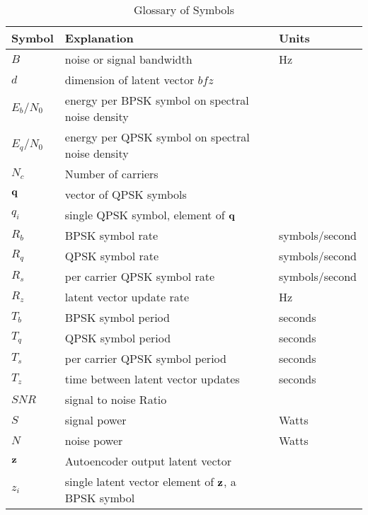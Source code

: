 \documentclass{article}
\begin{document}
\begin{table} [H]
\centering
\begin{tabular}{l l l}
 \hline
 Symbol & Explanation & Units \\
 \hline
 $B$ & noise or signal bandwidth & Hz \\
 $d$ & dimension of latent vector $bf{z}$ \\
 $E_b/N_0$ & energy per BPSK symbol on spectral noise density \\
 $E_q/N_0$ & energy per QPSK symbol on spectral noise density \\
 $N_c$ & Number of carriers  \\
 $\bf{q}$ & vector of QPSK symbols \\ 
 $q_i$ & single QPSK symbol, element of $\bf{q}$ \\ 
 $R_b$ & BPSK symbol rate & symbols/second \\
 $R_q$ & QPSK symbol rate & symbols/second \\
 $R_s$ & per carrier QPSK symbol rate & symbols/second \\
 $R_z$ & latent vector update rate & Hz \\
 $T_b$ & BPSK symbol period & seconds \\
 $T_q$ & QPSK symbol period & seconds \\
 $T_s$ & per carrier QPSK symbol period & seconds\\
 $T_z$ & time between latent vector updates & seconds\\
 $SNR$ & signal to noise Ratio \\
 $S$ & signal power & Watts \\
 $N$ & noise power & Watts \\
 $\bf{z}$ & Autoencoder output latent vector \\ 
 $z_i$ & single latent vector element of $\bf{z}$, a BPSK symbol \\ 
 \hline
\end{tabular}
\caption{Glossary of Symbols}
\end{table}
\end{document}
